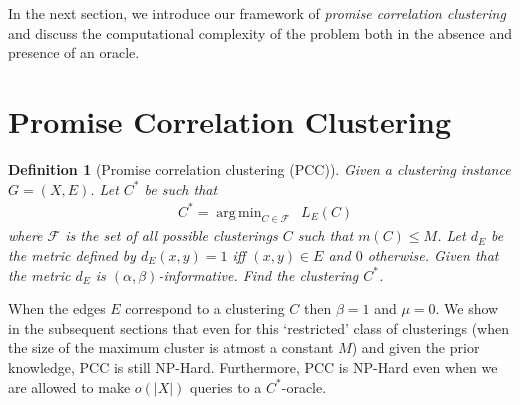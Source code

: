 \documentclass[12pt]{article}
\newtheorem{definition}[theorem]{Definition}
\newcommand{\mc}{\mathcal}
\DeclareMathOperator*{\argmin}{arg\,min}
\begin{document}
In the next section, we introduce our framework of \textit{promise correlation clustering} and discuss the computational complexity of the problem both in the absence and presence of an oracle.   

\section{Promise Correlation Clustering}
\label{section:PCC}

\begin{definition}[Promise correlation clustering (PCC)]
\label{defn:promiseCorrClustering}
Given a clustering instance $G = (X, E)$. Let $C^*$ be such that
\begin{align}
  &C^* = \argmin_{C \in \mc F} \enspace L_{E}(C) \label{eqn:promiseCorrLoss}
\end{align}
where $\mc F$ is the set of all possible clusterings $C$ such that $m(C) \le M$. Let $d_E$ be the metric defined by $d_E(x, y) = 1$ iff $(x, y) \in E$ and $0$ otherwise. Given that the metric $d_E$ is $(\alpha, \beta)$-informative. Find the clustering $C^*$. 
\end{definition}
When the edges $E$ correspond to a clustering $C$ then $\beta = 1$ and $\mu = 0$. We show in the subsequent sections that even for this `restricted' class of clusterings (when the size of the maximum cluster is atmost a constant $M$) and given the prior knowledge, PCC is still NP-Hard. Furthermore, PCC is NP-Hard even when we are allowed to make $o(|X|)$ queries to a $C^*$-oracle. 
\end{document}
